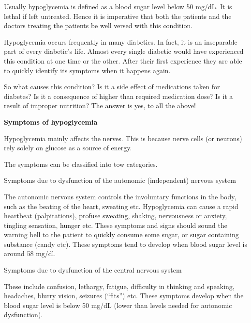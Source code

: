 Usually hypoglycemia is defined as a blood sugar level below 50 mg/dL. It is lethal if left untreated. Hence it is imperative that both the patients and the doctors treating the patients be well versed with this condition.

Hypoglycemia occurs frequently in many diabetics. In fact, it is an inseparable part of every diabetic’s life. Almost every single diabetic would have experienced this condition at one time or the other. After their first experience they are able to quickly identify its symptoms when it happens again.


So what causes this condition? Is it a side effect of medications taken for diabetes? Is it a consequence of higher than required medication dose? Is it a result of improper nutrition? The answer is yes, to all the above!

\textbf{Symptoms of hypoglycemia}

Hypoglycemia mainly affects the nerves. This is because nerve cells (or neurons) rely solely on glucose as a source of energy.

The symptoms can be classified into tow categories.

\item 
 Symptoms due to dysfunction of the autonomic (independent) nervous system

 The autonomic nervous system controls the involuntary functions in the body, such as the beating of the heart, sweating etc. Hypoglycemia can cause a rapid heartbeat (palpitations), profuse sweating, shaking, nervousness or anxiety, tingling sensation, hunger etc. These symptoms and signs should sound the warning bell to the patient to quickly consume some sugar, or sugar containing substance (candy etc). These symptoms tend to develop when blood sugar level is around 58 mg/dl.

 \item 
 Symptoms due to dysfunction of the central nervous system

 These include confusion, lethargy, fatigue, difficulty in thinking and speaking, headaches, blurry vision, seizures (“fits”) etc. These symptoms develop when the blood sugar level is below 50 mg/dL (lower than levels needed for autonomic dysfunction).\supskpt{\footnote{}}



